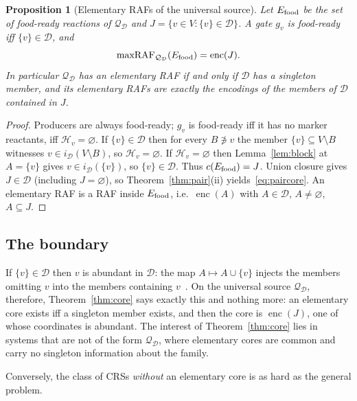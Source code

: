 \documentclass[11pt,a4paper]{article}
\theoremstyle{plain}
\newtheorem{proposition}[theorem]{Proposition}
\theoremstyle{definition}
\theoremstyle{remark}
\newcommand{\DD}{\mathcal D}
\newcommand{\HH}{\mathcal H}
\newcommand{\QQ}{\mathcal Q}
\newcommand{\enc}{\operatorname{enc}}
\newcommand{\mraf}{\operatorname{maxRAF}}
\begin{document}
\begin{proposition}[Elementary RAFs of the universal source]\label{prop:paircore}
Let $E_{\rm food}$ be the set of food-ready reactions of $\QQ_\DD$ and
$J=\{v\in V:\{v\}\in\DD\}$. A gate $g_v$ is food-ready iff $\{v\}\in\DD$, and
\begin{equation}\label{eq:paircore}
\mraf_{\QQ_\DD}(E_{\rm food})=\enc(J).
\end{equation}
In particular $\QQ_\DD$ has an elementary RAF if and only if $\DD$ has a singleton member,
and its elementary RAFs are exactly the encodings of the members of $\DD$ contained in $J$.
\end{proposition}
\begin{proof}
Producers are always food-ready; $g_v$ is food-ready iff it has no marker reactants, iff
$\HH_v=\varnothing$. If $\{v\}\in\DD$ then for every $B\not\ni v$ the member $\{v\}\subseteq V\setminus B$
witnesses $v\in i_\DD(V\setminus B)$, so $\HH_v=\varnothing$. If $\HH_v=\varnothing$ then
Lemma~\ref{lem:block} at $A=\{v\}$ gives $v\in i_\DD(\{v\})$, so $\{v\}\in\DD$. Thus
$c(E_{\rm food})=J$. Union closure gives $J\in\DD$ (including $J=\varnothing$), so
Theorem~\ref{thm:pair}(ii) yields~\eqref{eq:paircore}. An elementary RAF is a RAF inside
$E_{\rm food}$, i.e.\ $\enc(A)$ with $A\in\DD$, $A\neq\varnothing$, $A\subseteq J$.
\end{proof}

\subsection{The boundary}

If $\{v\}\in\DD$ then $v$ is abundant in $\DD$: the map $A\mapsto A\cup\{v\}$ injects the
members omitting $v$ into the members containing $v$~\cite{sarvate1989union}. On the
universal source $\QQ_\DD$, therefore, Theorem~\ref{thm:core} says exactly this and nothing
more: an elementary core exists iff a singleton member exists, and then the core is
$\enc(J)$, one of whose coordinates is abundant. The interest of Theorem~\ref{thm:core} lies
in systems that are not of the form $\QQ_\DD$, where elementary cores are common and
carry no singleton information about the family.

Conversely, the class of CRSs \emph{without} an elementary core is as hard as the general
problem.
\end{document}
